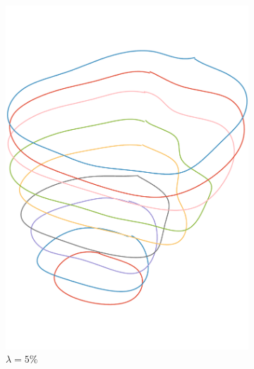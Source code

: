 \documentclass[article]{memoir}
\begin{document}
\begin{figure}[htbp]
    \centering
    \begin{subfigure}{0.32\textwidth}
        \includegraphics[width=\linewidth]{../images/curves_lambda_5_cropped.pdf}
        \caption{\( \lambda = 5 \% \)}
    \end{subfigure}
    \begin{subfigure}{0.32\textwidth}

\end{subfigure}
\end{figure}
\end{document}
